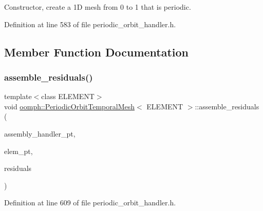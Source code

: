 Constructor, create a 1D mesh from 0 to 1 that is periodic. 



Definition at line 583 of file periodic\+\_\+orbit\+\_\+handler.\+h.



\subsection{Member Function Documentation}
\mbox{\label{classoomph_1_1PeriodicOrbitTemporalMesh_af1829044fa15d410cbd5d340d9c9e458}} 
\subsubsection{\texorpdfstring{assemble\+\_\+residuals()}{assemble\_residuals()}}
{\footnotesize\ttfamily template$<$class E\+L\+E\+M\+E\+NT$>$ \\
void \hyperlink{classoomph_1_1PeriodicOrbitTemporalMesh}{oomph\+::\+Periodic\+Orbit\+Temporal\+Mesh}$<$ E\+L\+E\+M\+E\+NT $>$\+::assemble\+\_\+residuals (\begin{DoxyParamCaption}\item[{\hyperlink{classoomph_1_1PeriodicOrbitAssemblyHandlerBase}{Periodic\+Orbit\+Assembly\+Handler\+Base} $\ast$const \&}]{assembly\+\_\+handler\+\_\+pt,  }\item[{\hyperlink{classoomph_1_1GeneralisedElement}{Generalised\+Element} $\ast$const \&}]{elem\+\_\+pt,  }\item[{\hyperlink{classoomph_1_1Vector}{Vector}$<$ double $>$ \&}]{residuals }\end{DoxyParamCaption})\hspace{0.3cm}{\ttfamily [inline]}}



Definition at line 609 of file periodic\+\_\+orbit\+\_\+handler.\+h.

\mbox{\label{classoomph_1_1PeriodicOrbitTemporalMesh_a5ca70a80e8673d43a0c5c15b021d10cd}} 
